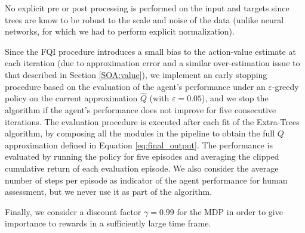 No explicit pre or post processing is performed on the input and targets since
trees are know to be robust to the scale and noise of the data (unlike neural
networks, for which we had to perform explicit normalization). 

Since the FQI procedure introduces a small bias to the action-value estimate at 
each iteration (due to approximation error and a similar over-estimation issue 
to that described in Section \ref{SOA:value}), we implement an early stopping 
procedure based on the evaluation of the agent's performance under an 
$\varepsilon$-greedy policy on the current approximation $\hat{Q}$ (with 
$\varepsilon = 0.05$), and we stop the algorithm if the agent's performance 
does not improve for five consecutive iterations.
The evaluation procedure is executed after each fit of the Extra-Trees
algorithm, by composing all the modules in the pipeline to obtain the full $Q$ 
approximation defined in Equation \eqref{eq:final_output}. 
The performance is evaluated by running the policy for five episodes and 
averaging the clipped cumulative return of each evaluation episode. 
We also consider the average number of steps per episode as indicator of the 
agent performance for human assessment, but we never use it as part of the 
algorithm. 

Finally, we consider a discount factor $\gamma = 0.99$ for the MDP in order to 
give importance to rewards in a sufficiently large time frame. 




